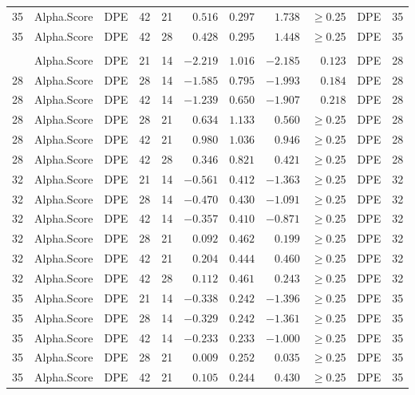 \documentclass[
]{article}
\begin{document}
\begin{longtable}{cllrrrrrrlc}
35 & Alpha.Score & DPE & 42 & 21 & $0.516$ & $0.297$ & $1.738$ & $\geq$0.25 & DPE & 35 \\ 
35 & Alpha.Score & DPE & 42 & 28 & $0.428$ & $0.295$ & $1.448$ & $\geq$0.25 & DPE & 35 \\ 
\midrule\addlinespace[2.5pt]
\multicolumn{11}{l}{Richness} \\ 
\midrule\addlinespace[2.5pt]
28 & Alpha.Score & DPE & 21 & 14 & $-2.219$ & $1.016$ & $-2.185$ & $0.123$ & DPE & 28 \\ 
28 & Alpha.Score & DPE & 28 & 14 & $-1.585$ & $0.795$ & $-1.993$ & $0.184$ & DPE & 28 \\ 
28 & Alpha.Score & DPE & 42 & 14 & $-1.239$ & $0.650$ & $-1.907$ & $0.218$ & DPE & 28 \\ 
28 & Alpha.Score & DPE & 28 & 21 & $0.634$ & $1.133$ & $0.560$ & $\geq$0.25 & DPE & 28 \\ 
28 & Alpha.Score & DPE & 42 & 21 & $0.980$ & $1.036$ & $0.946$ & $\geq$0.25 & DPE & 28 \\ 
28 & Alpha.Score & DPE & 42 & 28 & $0.346$ & $0.821$ & $0.421$ & $\geq$0.25 & DPE & 28 \\ 
32 & Alpha.Score & DPE & 21 & 14 & $-0.561$ & $0.412$ & $-1.363$ & $\geq$0.25 & DPE & 32 \\ 
32 & Alpha.Score & DPE & 28 & 14 & $-0.470$ & $0.430$ & $-1.091$ & $\geq$0.25 & DPE & 32 \\ 
32 & Alpha.Score & DPE & 42 & 14 & $-0.357$ & $0.410$ & $-0.871$ & $\geq$0.25 & DPE & 32 \\ 
32 & Alpha.Score & DPE & 28 & 21 & $0.092$ & $0.462$ & $0.199$ & $\geq$0.25 & DPE & 32 \\ 
32 & Alpha.Score & DPE & 42 & 21 & $0.204$ & $0.444$ & $0.460$ & $\geq$0.25 & DPE & 32 \\ 
32 & Alpha.Score & DPE & 42 & 28 & $0.112$ & $0.461$ & $0.243$ & $\geq$0.25 & DPE & 32 \\ 
35 & Alpha.Score & DPE & 21 & 14 & $-0.338$ & $0.242$ & $-1.396$ & $\geq$0.25 & DPE & 35 \\ 
35 & Alpha.Score & DPE & 28 & 14 & $-0.329$ & $0.242$ & $-1.361$ & $\geq$0.25 & DPE & 35 \\ 
35 & Alpha.Score & DPE & 42 & 14 & $-0.233$ & $0.233$ & $-1.000$ & $\geq$0.25 & DPE & 35 \\ 
35 & Alpha.Score & DPE & 28 & 21 & $0.009$ & $0.252$ & $0.035$ & $\geq$0.25 & DPE & 35 \\ 
35 & Alpha.Score & DPE & 42 & 21 & $0.105$ & $0.244$ & $0.430$ & $\geq$0.25 & DPE & 35 \\ 

\end{longtable}
\end{document}
